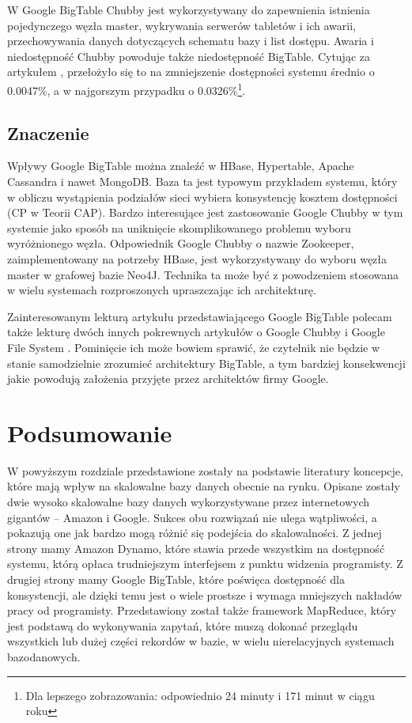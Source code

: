 W Google BigTable Chubby jest wykorzystywany do zapewnienia istnienia pojedynczego węzła master, wykrywania serwerów tabletów i ich awarii, przechowywania danych dotyczących schematu bazy i list dostępu.
Awaria i niedostępność Chubby powoduje także niedostępność BigTable.
Cytując za artykułem \cite{google-bigtable}, przełożyło się to na zmniejszenie dostępności systemu średnio o 0.0047\%, a w najgorszym przypadku o 0.0326\%\footnote{Dla lepszego zobrazowania: odpowiednio 24 minuty i 171 minut w ciągu roku}.

\subsection*{Znaczenie}

Wpływy Google BigTable można znaleźć w HBase, Hypertable, Apache Cassandra i nawet MongoDB.
Baza ta jest typowym przykładem systemu, który w obliczu wystąpienia podziałów sieci wybiera konsystencję kosztem dostępności (CP w Teorii CAP).
Bardzo interesujące jest zastosowanie Google Chubby w tym systemie jako sposób na uniknięcie skomplikowanego problemu wyboru wyróżnionego węzła.
Odpowiednik Google Chubby o nazwie Zookeeper, zaimplementowany na potrzeby HBase, jest wykorzystywany do wyboru węzła master w grafowej bazie Neo4J.
Technika ta może być z powodzeniem stosowana w wielu systemach rozproszonych upraszczając ich architekturę.

Zainteresowanym lekturą artykułu przedstawiającego Google BigTable \cite{google-bigtable} polecam także lekturę dwóch innych pokrewnych artykułów o Google Chubby \cite{google-chubby} i Google File System \cite{google-file-system}.
Pominięcie ich może bowiem sprawić, że czytelnik nie będzie w stanie samodzielnie zrozumieć architektury BigTable, a tym bardziej konsekwencji jakie powodują założenia przyjęte przez architektów firmy Google.

\section{Podsumowanie}

W powyższym rozdziale przedstawione zostały na podstawie literatury koncepcje, które mają wpływ na skalowalne bazy danych obecnie na rynku.
Opisane zostały dwie wysoko skalowalne bazy danych wykorzystywane przez internetowych gigantów -- Amazon i Google.
Sukces obu rozwiązań nie ulega wątpliwości, a pokazują one jak bardzo mogą różnić się podejścia do skalowalności.
Z jednej strony mamy Amazon Dynamo, które stawia przede wszystkim na dostępność systemu, którą opłaca trudniejszym interfejsem z punktu widzenia programisty.
Z drugiej strony mamy Google BigTable, które poświęca dostępność dla konsystencji, ale dzięki temu jest o wiele prostsze i wymaga mniejszych nakładów pracy od programisty.
Przedstawiony został także framework MapReduce, który jest podstawą do wykonywania zapytań, które muszą dokonać przeglądu wszystkich lub dużej części rekordów w bazie, w wielu nierelacyjnych systemach bazodanowych.